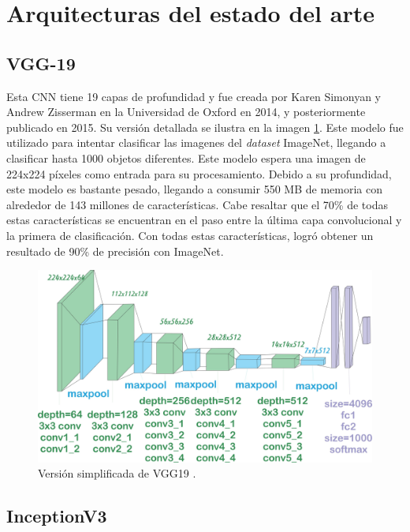 \section{Arquitecturas del estado del arte}
\label{arquitecturas}

\subsection{VGG-19}
Esta CNN tiene 19 capas de profundidad y fue creada por Karen Simonyan y Andrew Zisserman 
\cite{Simonyan2015} en la Universidad de Oxford en 2014, y posteriormente publicado en 
2015. Su versión detallada se ilustra en la imagen \ref{VGG19}. Este modelo fue utilizado 
para intentar clasificar las imagenes del 
\textit{dataset} ImageNet, llegando a clasificar hasta 1000 objetos diferentes. 
Este modelo espera una imagen de 224x224 píxeles como entrada para su procesamiento. 
Debido a su profundidad, este modelo es bastante pesado, llegando a consumir 550 MB de 
memoria con alrededor de 143 millones de características. Cabe resaltar que el 70\% de 
todas estas características se encuentran en el paso entre la última capa convolucional y la 
primera de clasificación. Con todas estas características, logró obtener un resultado 
de 90\% de precisión con ImageNet.

\begin{figure}[h!]
\includegraphics[width=1\textwidth]{images/VGG19.jpeg}
\centering
\caption{Versión simplificada de VGG19 \protect\cite{modelos}. }
\label{VGG19}
\end{figure}

\subsection{InceptionV3}
\label{sec:inceptionV3}

